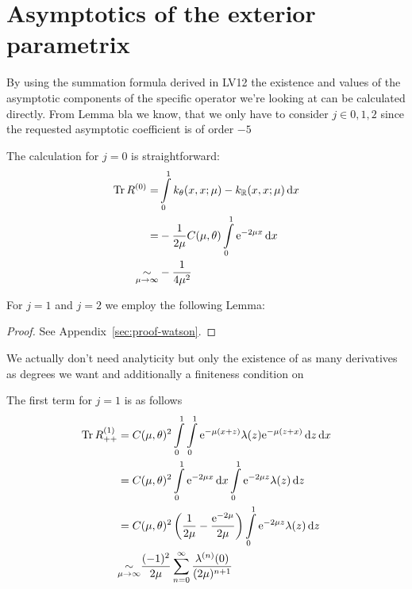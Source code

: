 \section{Asymptotics of the exterior parametrix}
By using the summation formula derived in LV12 the existence and values of the
asymptotic components of the specific operator we're looking at can be
calculated directly. From Lemma bla we know, that we only have to consider $j\in
{0, 1, 2}$ since the requested asymptotic coefficient is of order $-5$ %

The calculation for $j=0$ is straightforward:
\begin{align}
    \Tr R^{(0)} =& \Integ[1]{0}{x}{k_\theta(x,x;\mu) - k_\mathbb{R}(x,x;\mu)} \\
    =& -\frac1{2\mu} C(\mu,\theta) \Integ[1]{0}{x}{\Eto{-2\mu x}} \\
    \SimAs{\mu\to\infty}& -\frac1{4\mu^2}
    \label{eqn:jeq0}
\end{align}

For $j=1$ and $j=2$ we employ the following Lemma:
\begin{Lemma}[Watson]
    
    \begin{proof}
        See Appendix~\ref{sec:proof-watson}.
    \end{proof}
    \begin{Remark}
        We actually don't need analyticity but only the existence of as many
        derivatives as degrees we want and additionally a finiteness condition
        on
    \end{Remark}
\end{Lemma}

The first term for $j=1$ is as follows
\begin{align*}
    \Tr R^{(1)}_{++} &= C(\mu,\theta)^2
        \Integ[1]{0}{x}{
            \Integ[1]{0}{z}{\Eto{-\mu(x+z)}
                \lambda(z)\Eto{-\mu(z+x)}
            }
        }
        \\
        &= C(\mu,\theta)^2
            \Integ[1]{0}{x}{
                \Eto{-2\mu x}
            }
            \Integ[1]{0}{z}{\Eto{-2\mu z}\lambda(z)}
        \\
        &= C(\mu, \theta)^2 \left(
            \frac1{2\mu} - \frac{\Eto{-2\mu}}{2\mu}
           \right)
           \Integ[1]{0}{z}{\Eto{-2\mu z}\lambda(z)}
        \\
        &\SimAs{\mu\to\infty}
            \frac{(-1)^2}{2\mu}
            \sum_{n=0}^{\infty}\frac{\lambda^{(n)}(0)}{(2\mu)^{n+1}}
\end{align*}

